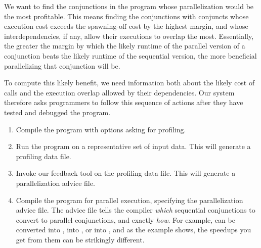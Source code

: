 
We want to find the conjunctions in the program
whose parallelization would be the most profitable.
This means finding the conjunctions with conjuncts
whose execution cost exceeds the spawning-off cost by the highest margin,
and whose interdependencies, if any,
allow their executions to overlap the most.
Essentially, the greater the margin by which
the likely runtime of the parallel version of a conjunction beats
the likely runtime of the sequential version,
the more beneficial parallelizing that conjunction will be.

To compute this likely benefit,
we need information
both about the likely cost of calls
and the execution overlap allowed by their dependencies.
Our system therefore asks programmers
to follow this sequence of actions
after they have tested and debugged the program.

\begin{enumerate}
\item
Compile the program
with options asking for profiling.
\item
Run the program on a representative set of input data.
This will generate a profiling data file.
\item
Invoke our feedback tool on the profiling data file.
This will generate a parallelization advice file.
\item
Compile the program for parallel execution,
specifying the parallelization advice file.
The advice file tells the compiler
\emph{which} sequential conjunctions to convert to parallel conjunctions,
and exactly \emph{how}.
For example,  can be converted
into ,
into , or
into ,
and as the  example shows,
the speedups you get from them can be strikingly different.
\end{enumerate}

